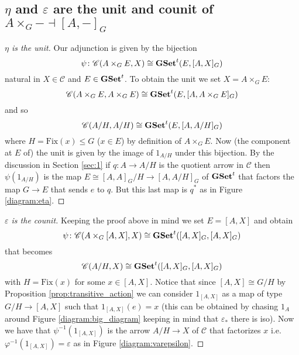 \documentclass[italian, 12pt, reqno]{article}
\theoremstyle{myteo}
\numberwithin{equation}{section}
\newcommand{\cat}[1]{\mathscr{#1}}
\newcommand{\tgset}{\text{\textbf{GSet}}^t}
\newcommand{\homs}[2]{[#1, #2]}
\newcommand{\fun}[3]{#1\colon#2\to #3}
\begin{document}
\subsection{\(\eta\) and \(\varepsilon\) are the unit and counit of \(A\times_G- \dashv \homs{A}{-}_G\)}

\begin{proof}[\(\eta\) is the unit]
  Our adjunction is given by the bijection
  \[\psi\colon\cat{C}(A\times_G E, X)\cong\tgset(E, \homs{A}{X}_G)\]
  natural in \(X\in\cat{C}\) and \(E\in\tgset\).
  To obtain the unit we set \(X = A\times_G E\):
  \[\cat{C}(A\times_G E, A\times_G E)\cong\tgset(E, \homs{A}{A\times_G E}_G)\]
  and so
  \[\cat{C}(A/H, A/H)\cong\tgset(E, \homs{A}{A/H}_G)\]
  where \(H = \text{Fix}(x)\leq G\) (\(x\in E\)) by definition of \(A\times_G E\).
  Now (the component at \(E\) of) the unit is given by the image of \(1_{A/H}\) under this bijection.
  By the discussion in Section \ref{sec:1} if \(\fun{q}{A}{A/H}\) is the quotient arrow in \(\cat{C}\) then \(\psi(1_{A/H})\) is the map \(E\cong\homs{A}{A}_G/H \to \homs{A}{A/H}_G\) of \(\tgset\) that factors the map \(G\to E\) that sends \(e\) to \(q\).
  But this last map is \(q^*\) as in Figure \ref{diagram:eta}.
\end{proof}

\begin{proof}[\(\varepsilon\) is the counit]
  Keeping the proof above in mind we set \(E = \homs{A}{X}\) and obtain
  \[\psi\colon \cat{C}(A\times_G\homs{A}{X}, X) \cong \tgset(\homs{A}{X}_G, \homs{A}{X}_G)\]
  that becomes
  \[\cat{C}(A/H, X) \cong \tgset(\homs{A}{X}_G, \homs{A}{X}_G)\]
  with \(H = \text{Fix}(x)\) for some \(x\in\homs{A}{X}\).
  Notice that since \(\homs{A}{X}\cong G/H\) by Proposition \ref{prop:transitive_action} we can consider \(1_{\homs{A}{X}}\) as a map of type \(G/H \to \homs{A}{X}\) such that \(1_{\homs{A}{X}}(e) = x\) (this can be obtained by chasing \(1_A\) around Figure \ref{diagram:big_diagram} keeping in mind that \(\varepsilon_*\) there is iso).
  Now we have that \(\psi^{-1}(1_{\homs{A}{X}})\) is the arrow \(A/H\to X\) of \(\cat{C}\) that factorizes \(x\) i.e. \(\varphi^{-1}(1_{\homs{A}{X}}) = \varepsilon\) as in Figure \ref{diagram:varepsilon}.
\end{proof}
\end{document}
